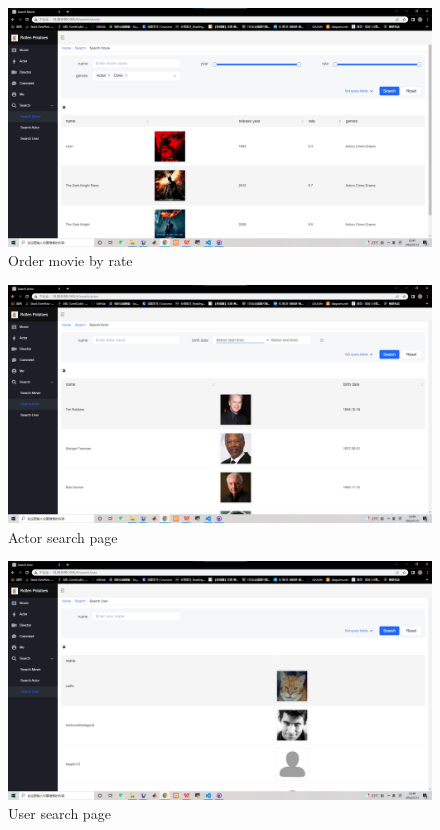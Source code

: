 \begin{CJK*}{UTF8}{gbsn}
\begin{figure}[htbp]
\centering
\includegraphics[width=1\textwidth]{res_search7.png}
\caption{Order movie by rate}
\end{figure}

\begin{figure}[htbp]
\centering
\includegraphics[width=1\textwidth]{res_search8.png}
\caption{Actor search page}
\end{figure}


\begin{figure}[htbp]
\centering
\includegraphics[width=1\textwidth]{res_search9.png}
\caption{User search page}
\end{figure}



\end{CJK*}
